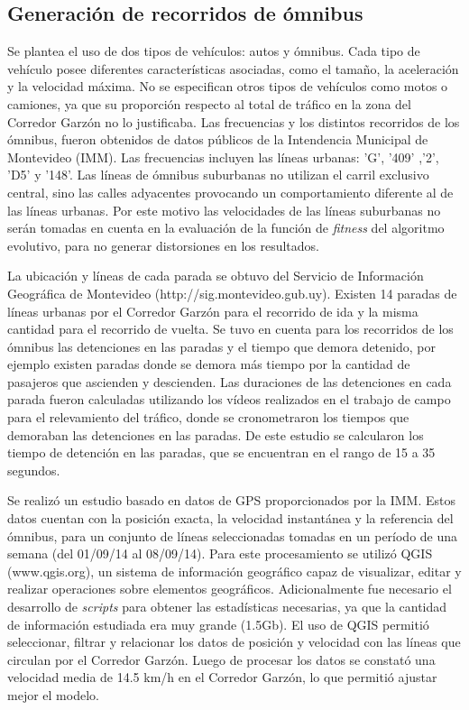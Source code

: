 \subsection{Generación de recorridos de ómnibus}

Se plantea el uso de dos tipos de vehículos: autos y ómnibus. Cada tipo de vehículo posee diferentes características asociadas, como el tamaño, la aceleración y la velocidad máxima. No se especifican otros tipos de vehículos como motos o camiones, ya que su proporción respecto al total de tráfico en la zona del Corredor Garzón no lo justificaba. Las frecuencias y los distintos recorridos de los ómnibus, fueron obtenidos de datos públicos de la Intendencia Municipal de Montevideo (IMM). Las frecuencias incluyen las líneas urbanas: 'G', '409' ,'2', 'D5'  y  '148'. Las líneas de ómnibus suburbanas no utilizan el carril exclusivo central, sino las calles adyacentes provocando un comportamiento diferente al de las líneas urbanas. Por este motivo las velocidades de las líneas suburbanas no serán tomadas en cuenta en la evaluación de la función de \emph{fitness} del algoritmo evolutivo, para no generar distorsiones en los resultados.

La ubicación y líneas de cada parada se obtuvo del Servicio de Información Geográfica de Montevideo (http://sig.montevideo.gub.uy). Existen 14 paradas de líneas urbanas por el Corredor Garzón para el recorrido de ida y la misma cantidad para el recorrido de vuelta. Se tuvo en cuenta para los recorridos de los ómnibus las detenciones en las paradas y el tiempo que demora detenido, por ejemplo existen paradas donde se demora más tiempo por la cantidad de pasajeros que ascienden y descienden. Las duraciones de las detenciones en cada parada fueron calculadas utilizando los vídeos realizados en el trabajo de campo para el relevamiento del tráfico, donde se cronometraron los tiempos que demoraban las detenciones en las paradas. De este estudio se calcularon los tiempo de detención en las paradas, que se encuentran en el rango de 15 a 35 segundos.

Se realizó un estudio basado en datos de GPS proporcionados por la IMM. Estos datos cuentan con la posición exacta, la velocidad instantánea y la referencia del ómnibus, para un conjunto de líneas seleccionadas tomadas en un período de una semana (del 01/09/14 al 08/09/14). 
Para este procesamiento se utilizó QGIS (www.qgis.org), un sistema de información geográfico capaz de visualizar, editar y realizar operaciones sobre elementos geográficos. Adicionalmente fue necesario el desarrollo de \emph{scripts} para obtener las estadísticas necesarias, ya que la cantidad de información estudiada era muy grande (1.5Gb). El uso de QGIS permitió seleccionar, filtrar y relacionar los datos de posición y velocidad con las líneas que circulan por el Corredor Garzón. Luego de procesar los datos se constató una velocidad media de 14.5 km/h en el Corredor Garzón, lo que permitió ajustar mejor el modelo. 


